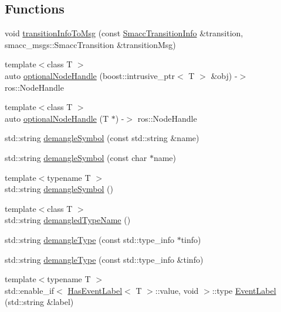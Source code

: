 \subsection*{Functions}
\begin{DoxyCompactItemize}
\item 
void \hyperlink{namespacesmacc_1_1introspection_a6c1b51c4d44fd5e41fe218f1ee150681}{transition\+Info\+To\+Msg} (const \hyperlink{structsmacc_1_1introspection_1_1SmaccTransitionInfo}{Smacc\+Transition\+Info} \&transition, smacc\+\_\+msgs\+::\+Smacc\+Transition \&transition\+Msg)
\item 
{\footnotesize template$<$class T $>$ }\\auto \hyperlink{namespacesmacc_1_1introspection_a8acc3b4146a8b2bb0a9fa4178840e9b9}{optional\+Node\+Handle} (boost\+::intrusive\+\_\+ptr$<$ T $>$ \&obj) -\/$>$ ros\+::\+Node\+Handle
\item 
{\footnotesize template$<$class T $>$ }\\auto \hyperlink{namespacesmacc_1_1introspection_a96b953e65af67591266e9ae4b3e4ee49}{optional\+Node\+Handle} (T $\ast$) -\/$>$ ros\+::\+Node\+Handle
\item 
std\+::string \hyperlink{namespacesmacc_1_1introspection_a2f495108db3e57604d8d3ff5ef030302}{demangle\+Symbol} (const std\+::string \&name)
\item 
std\+::string \hyperlink{namespacesmacc_1_1introspection_af32c671351d958213f8031bb90767922}{demangle\+Symbol} (const char $\ast$name)
\item 
{\footnotesize template$<$typename T $>$ }\\std\+::string \hyperlink{namespacesmacc_1_1introspection_aa9158a0ff0cfe83a59877e6af7d7f873}{demangle\+Symbol} ()
\item 
{\footnotesize template$<$class T $>$ }\\std\+::string \hyperlink{namespacesmacc_1_1introspection_af1b3277706c3299b589c3fa801169286}{demangled\+Type\+Name} ()
\item 
std\+::string \hyperlink{namespacesmacc_1_1introspection_a670e39ccea29952859df4e2d0e45077b}{demangle\+Type} (const std\+::type\+\_\+info $\ast$tinfo)
\item 
std\+::string \hyperlink{namespacesmacc_1_1introspection_a81ad2fc77a0262640d4b1bd273938603}{demangle\+Type} (const std\+::type\+\_\+info \&tinfo)
\item 
{\footnotesize template$<$typename T $>$ }\\std\+::enable\+\_\+if$<$ \hyperlink{classsmacc_1_1introspection_1_1HasEventLabel}{Has\+Event\+Label}$<$ T $>$\+::value, void $>$\+::type \hyperlink{namespacesmacc_1_1introspection_a7d5ea10a24373bf452d3b6987d0a6bd0}{Event\+Label} (std\+::string \&label)

\end{DoxyCompactItemize}
